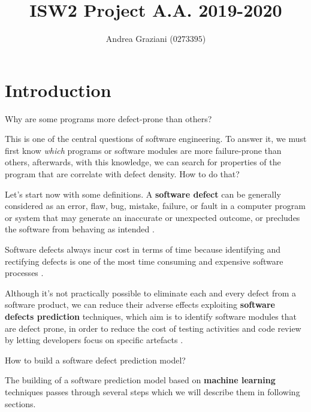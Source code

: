 \documentclass[sigconf]{acmart}
\begin{document}
\title{ISW2 Project A.A. 2019-2020}

\author{Andrea Graziani ($0273395$)}

\maketitle

\section{Introduction}

Why are some programs more defect-prone than others? 

This is one of the central questions of software engineering. To answer it, we must first know \textit{which} programs or software modules are more failure-prone than others, afterwards, with this knowledge, we can search for properties of the program that are correlate with defect density. How to do that?

Let's start now with some definitions. A \textbf{software defect} can be generally considered as an error, flaw, bug, mistake, failure, or fault in a computer program or system that may generate an inaccurate or unexpected outcome, or precludes the software from behaving as intended \cite{SoftwareDefectPredictionRawat}.

Software defects always incur cost in terms of time because identifying and rectifying defects is one of the most time consuming and expensive software processes \cite{SoftwareDefectPredictionRawat}.

Although it's not practically possible to eliminate each and every defect from a software product, we can reduce their adverse effects exploiting \textbf{software defects prediction} techniques, which aim is to identify software modules that are defect prone, in order to reduce the cost of testing activities and code review by letting developers focus on specific artefacts \citep{Falessi}.

How to build a software defect prediction model? 

The building of a software prediction model based on \textbf{machine learning} techniques passes through several steps which we will describe them in following sections.
\end{document}
